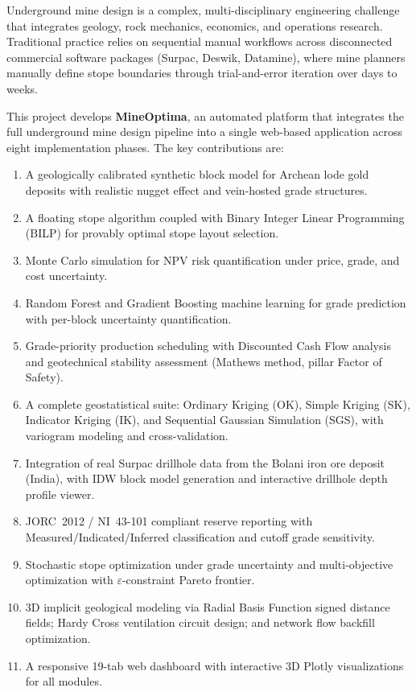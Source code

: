 \documentclass[12pt,a4paper]{article}
\begin{document}
Underground mine design is a complex, multi-disciplinary engineering challenge that integrates geology, rock mechanics, economics, and operations research. Traditional practice relies on sequential manual workflows across disconnected commercial software packages (Surpac, Deswik, Datamine), where mine planners manually define stope boundaries through trial-and-error iteration over days to weeks.

This project develops \textbf{MineOptima}, an automated platform that integrates the full underground mine design pipeline into a single web-based application across eight implementation phases. The key contributions are:

\begin{enumerate}[itemsep=0.3em]
    \item A geologically calibrated synthetic block model for Archean lode gold deposits with realistic nugget effect and vein-hosted grade structures.
    \item A floating stope algorithm coupled with Binary Integer Linear Programming (BILP) for provably optimal stope layout selection.
    \item Monte Carlo simulation for NPV risk quantification under price, grade, and cost uncertainty.
    \item Random Forest and Gradient Boosting machine learning for grade prediction with per-block uncertainty quantification.
    \item Grade-priority production scheduling with Discounted Cash Flow analysis and geotechnical stability assessment (Mathews method, pillar Factor of Safety).
    \item A complete geostatistical suite: Ordinary Kriging (OK), Simple Kriging (SK), Indicator Kriging (IK), and Sequential Gaussian Simulation (SGS), with variogram modeling and cross-validation.
    \item Integration of real Surpac drillhole data from the Bolani iron ore deposit (India), with IDW block model generation and interactive drillhole depth profile viewer.
    \item JORC~2012 / NI~43-101 compliant reserve reporting with Measured/Indicated/Inferred classification and cutoff grade sensitivity.
    \item Stochastic stope optimization under grade uncertainty and multi-objective optimization with $\varepsilon$-constraint Pareto frontier.
    \item 3D implicit geological modeling via Radial Basis Function signed distance fields; Hardy Cross ventilation circuit design; and network flow backfill optimization.
    \item A responsive 19-tab web dashboard with interactive 3D Plotly visualizations for all modules.
\end{enumerate}
\end{document}
